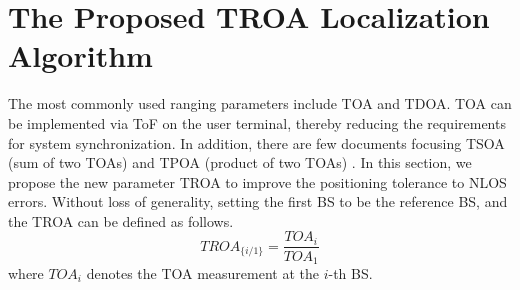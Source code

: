 \documentclass[journal]{IEEEtran}
\begin{document}
\section{The Proposed TROA Localization Algorithm}
The most commonly used ranging parameters include TOA and TDOA. TOA can be implemented via ToF on the user terminal, thereby reducing the requirements for system synchronization\cite{re36}. In addition, there are few documents focusing TSOA (sum of two TOAs) and TPOA (product of two TOAs) \cite{re33}. In this section, we propose the new parameter TROA to improve the positioning tolerance to NLOS errors. Without loss of generality, setting the first BS to be the reference BS, and the TROA can be defined as follows.
\begin{equation}\label{eq:2.1}
TRO{{A}_{\{i/1\}}}=\frac{TO{{A}_{i}}}{TO{{A}_{1}}}
\end{equation}
where ${TO{{A}_{i}}}$ denotes the TOA measurement at the $i$-th BS.
\end{document}
